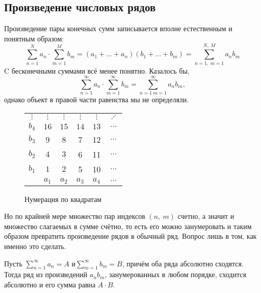 \documentclass[a4paper, 12pt]{article}
\begin{document}
\subsection{Произведение числовых рядов}
	Произведение пары конечных сумм записывается вполне естественным и понятным образом:
	\[
	\sum\limits_{n=1}^{N}a_n \cdot \sum\limits_{m=1}^{M}b_m = (a_1 + \dots + a_n) (b_1 + \dots + b_m)=\sum\limits_{n=1, \ m=1}^{N,\  M}a_nb_m
	\]
	C бесконечными суммами всё менее понятно. Казалось бы,
	\[
	\sum\limits_{n=1}^{\infty}a_n \cdot \sum\limits_{m=1}^{\infty}b_m = \sum\limits_{n=1 \ m=1}^{\infty}a_nb_m,
	\] однако объект в правой части равенства мы не определяли.

	\medskip
	
	\begin{wrapfigure}{l}{0.3\linewidth}
		\begin{tabular}[t]{c|ccccc}
			$\vdots$ & $\vdots$ & $\vdots$ & $\vdots$ &$\vdots$& $\iddots$ \\
			$b_4$ & $16$ & $15$ & $14$ & $13$ &$\dots$\\
			$b_3$ & 9 & 8 & 7 &  12&$\dots$ \\
			$b_2$ & $4$ & $3$ & 6 & 11&$\dots$ \\
			$b_1$ & $1$ & $2$ & 5 & 10& $\dots $\\
			\hline
			& $a_1$ & $a_2$ & $a_3$ & $a_4$ &$\dots$ 
		\end{tabular}
		\caption{Нумерация по квадратам}
		\vspace{-50pt}
	\end{wrapfigure}
	Но по крайней мере множество пар индексов $(n,\ m)$ счетно, а значит и множество слагаемых в сумме счётно, то есть его можно занумеровать и таким образом превратить произведение рядов в обычный ряд. Вопрос лишь в том, как именно это сделать.
	
	\begin{Theorem}
		Пусть $\sum\limits_{n=1}^{\infty}a_n =A $ и$ \sum\limits_{m=1}^{\infty}b_m = B$, причём оба ряда абсолютно сходятся. Тогда ряд из произведений $a_nb_m$, занумерованных в любом порядке, сходится абсолютно и его сумма равна $A\cdot B$.
	\end{Theorem} 
	
\smallskip
\end{document}
